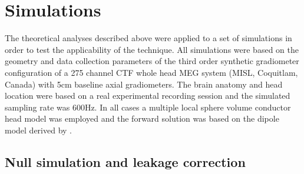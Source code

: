 \section{Simulations}\label{sec_cca_sims}
The theoretical analyses described above were applied to a set of simulations in order to test the applicability of the technique. All simulations were based on the geometry and data collection parameters of the third order synthetic gradiometer configuration of a 275 channel CTF whole head MEG system (MISL, Coquitlam, Canada) with 5cm baseline axial gradiometers. The brain anatomy and head location were based on a real experimental recording session and the simulated sampling rate was 600Hz. In all cases a multiple local sphere volume conductor head model \citep{Huang1999} was employed and the forward solution was based on the dipole model derived by \cite{Sarvas1987}.

\subsection{Null simulation and leakage correction}
